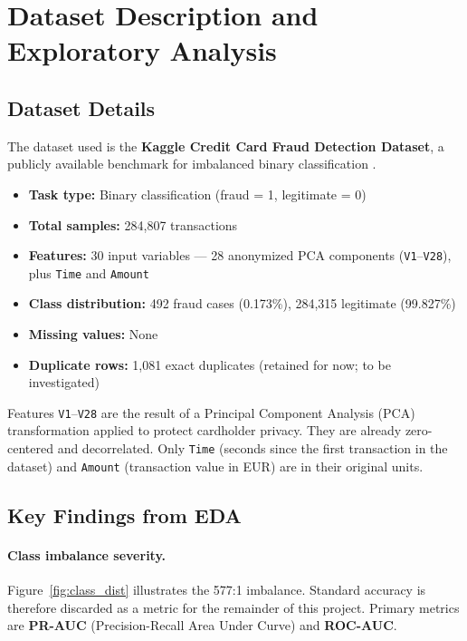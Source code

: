 \documentclass[11pt, a4paper]{article}
\begin{document}
\section{Dataset Description and Exploratory Analysis}

\subsection{Dataset Details}

The dataset used is the \textbf{Kaggle Credit Card Fraud Detection Dataset}, a publicly
available benchmark for imbalanced binary classification \cite{kaggle_ccfd}.

\begin{itemize}
    \item \textbf{Task type:} Binary classification (fraud = 1, legitimate = 0)
    \item \textbf{Total samples:} 284,807 transactions
    \item \textbf{Features:} 30 input variables — 28 anonymized PCA components
          (\texttt{V1}--\texttt{V28}), plus \texttt{Time} and \texttt{Amount}
    \item \textbf{Class distribution:} 492 fraud cases (0.173\%), 284,315 legitimate (99.827\%)
    \item \textbf{Missing values:} None
    \item \textbf{Duplicate rows:} 1,081 exact duplicates (retained for now; to be investigated)
\end{itemize}

Features \texttt{V1}--\texttt{V28} are the result of a Principal Component Analysis (PCA)
transformation applied to protect cardholder privacy. They are already zero-centered and
decorrelated. Only \texttt{Time} (seconds since the first transaction in the dataset) and
\texttt{Amount} (transaction value in EUR) are in their original units.

\subsection{Key Findings from EDA}

\paragraph{Class imbalance severity.}
Figure~\ref{fig:class_dist} illustrates the 577:1 imbalance. Standard accuracy is
therefore discarded as a metric for the remainder of this project. Primary metrics are
\textbf{PR-AUC} (Precision-Recall Area Under Curve) and \textbf{ROC-AUC}.
\end{document}
